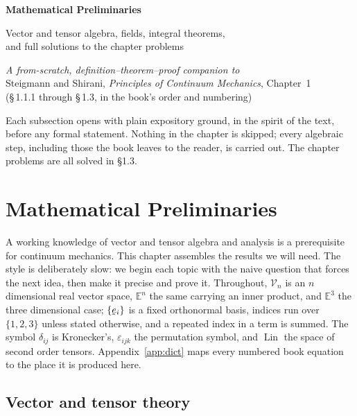 \documentclass[17pt,a4paper]{extreport}
\DeclareRobustCommand{\vek}[1]{\underaccent{\tilde}{#1}}
\newcommand{\Vn}{\mathcal{V}_{n}}
\newcommand{\En}{\mathbb{E}^{n}}
\newcommand{\Et}{\mathbb{E}^{3}}
\newcommand{\Lin}{\operatorname{Lin}}
\newcommand{\be}{\vek{e}}
\newcommand{\dd}{\delta}
\newcommand{\eps}{\varepsilon}
\theoremstyle{scplain}
\theoremstyle{scdefn}
\theoremstyle{scplain}
\begin{document}
\begin{titlepage}
\centering
\vspace*{3cm}
{\Large\bfseries Mathematical Preliminaries\par}
\vspace{4mm}
{\large Vector and tensor algebra, fields, integral theorems,\\
and full solutions to the chapter problems\par}
\vspace{8mm}
{\itshape A from-scratch, definition--theorem--proof companion to}\\[2mm]
{Steigmann and Shirani, \emph{Principles of Continuum Mechanics},
Chapter~1}\\[1mm]
{(\S\,1.1.1 through \S\,1.3, in the book's order and numbering)}
\vfill
{\small Each subsection opens with plain expository ground, in the spirit
of the text, before any formal statement. Nothing in the chapter is
skipped; every algebraic step, including those the book leaves to the
reader, is carried out. The chapter problems are all solved in \S1.3.\par}
\vspace{1cm}
\end{titlepage}

\tableofcontents

\chapter{Mathematical Preliminaries}

A working knowledge of vector and tensor algebra and analysis is a
prerequisite for continuum mechanics. This chapter assembles the results
we will need. The style is deliberately slow: we begin each topic with the
naive question that forces the next idea, then make it precise and prove
it. Throughout, $\Vn$ is an $n$ dimensional real vector space, $\En$ the
same carrying an inner product, and $\Et$ the three dimensional case;
$\{\be_i\}$ is a fixed orthonormal basis, indices run over $\{1,2,3\}$
unless stated otherwise, and a repeated index in a term is summed. The
symbol $\dd_{ij}$ is Kronecker's, $\eps_{ijk}$ the permutation symbol, and
$\Lin$ the space of second order tensors. Appendix~\ref{app:dict} maps
every numbered book equation to the place it is produced here.

\section{Vector and tensor theory}\label{sec:vtt}
\end{document}
